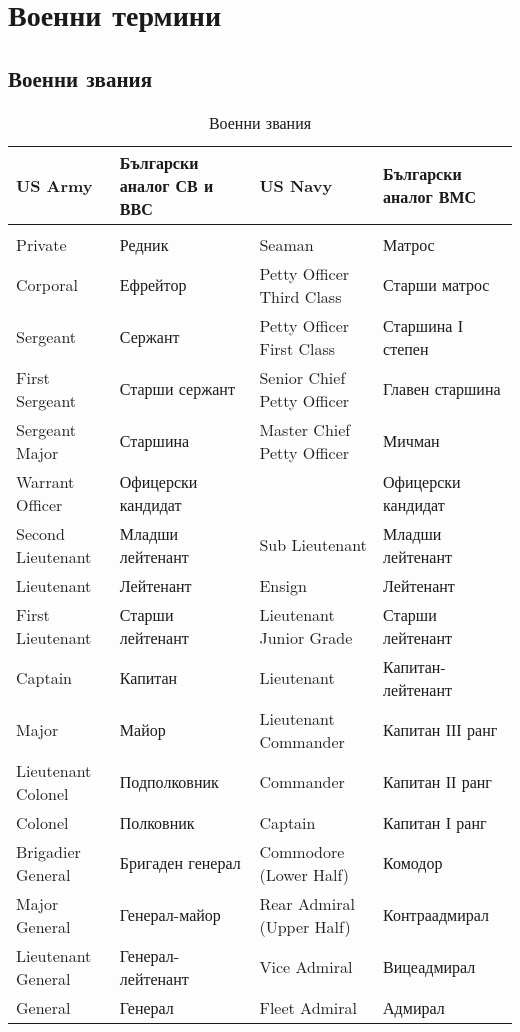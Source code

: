 \chapter{Военни термини}

\section{Военни звания}
\begin{longtable}{|p{}|p{}|p{}|p{}|}
\hline
\textbf{US Army} & \textbf{Български аналог СВ и ВВС} & \textbf{US Navy} & \textbf{Български аналог ВМС} \\
\hline
\endhead
\hline
\endfoot
\hline
\caption{Военни звания} \label{tab:voenni-zvanija} \\
\endlastfoot
\hline
 Private & Редник & Seaman & Матрос
\\ Corporal & Ефрейтор & Petty Officer Third Class & Старши матрос
\\ Sergeant & Сержант & Petty Officer First Class & Старшина І степен
\\ First Sergeant & Старши сержант & Senior Chief Petty Officer  &Главен старшина
\\ Sergeant Major & Старшина & Master Chief Petty Officer & Мичман
\\ Warrant Officer & Офицерски кандидат && Офицерски кандидат  
\\ Second Lieutenant & Младши лейтенант & Sub Lieutenant & Младши лейтенант
\\ Lieutenant & Лейтенант & Ensign & Лейтенант
\\ First Lieutenant & Старши лейтенант & Lieutenant Junior Grade & Старши лейтенант
\\ Captain & Капитан & Lieutenant & Капитан-лейтенант
\\ Major & Майор & Lieutenant Commander & Капитан ІІІ ранг
\\ Lieutenant Colonel & Подполковник & Commander & Капитан ІІ ранг
\\ Colonel & Полковник & Captain & Капитан І ранг
\\ Brigadier General & Бригаден генерал & Commodore (Lower Half) & Комодор
\\ Major General & Генерал-майор & Rear Admiral (Upper Half) & Контраадмирал
\\ Lieutenant General & Генерал-лейтенант & Vice Admiral  &Вицеадмирал
\\ General & Генерал & Fleet Admiral & Адмирал
\\
\end{longtable}

